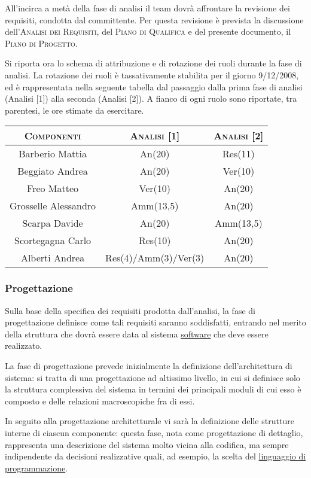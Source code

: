 \documentclass[11pt,a4paper]{article}
\begin{document}
All'incirca a metà della fase di analisi il team dovrà affrontare la revisione dei requisiti, condotta dal committente.
Per questa revisione è prevista la discussione dell'\textsc{Analisi dei Requisiti}, del \textsc{Piano di Qualifica} e del presente documento, il \textsc{Piano di Progetto}.

Si riporta ora lo schema di attribuzione e di rotazione dei ruoli durante la fase di analisi.
La rotazione dei ruoli è tassativamente stabilita per il giorno 9/12/2008, ed è rappresentata nella seguente tabella dal passaggio dalla prima fase di analisi (Analisi [1]) alla seconda (Analisi [2]).
A fianco di ogni ruolo sono riportate, tra parentesi, le ore stimate da esercitare.
\\
\begin{center}
\begin{tabular}{|c||c|c|}
\hline
\textsc{Componenti} & \textsc{Analisi [1]} & \textsc{Analisi [2]} \\ \hline \hline
Barberio Mattia & An(20) & Res(11) \\ \hline
Beggiato Andrea & An(20) & Ver(10) \\ \hline
Freo Matteo & Ver(10) & An(20) \\ \hline
Grosselle Alessandro & Amm(13,5) & An(20) \\ \hline
Scarpa Davide & An(20) & Amm(13,5) \\ \hline
Scortegagna Carlo & Res(10) & An(20) \\ \hline
Alberti Andrea & Res(4)/Amm(3)/Ver(3) & An(20) \\ \hline
\end{tabular}
\end{center}
\bigskip
\subsubsection{Progettazione}
Sulla base della specifica dei requisiti prodotta dall'analisi, la fase di progettazione definisce come tali requisiti saranno soddisfatti, entrando nel merito della struttura che dovrà essere data al sistema \underline{software} che deve essere realizzato.

La fase di progettazione prevede inizialmente la definizione dell'architettura di sistema: si tratta di una progettazione ad altissimo livello, in cui si definisce solo la struttura complessiva del sistema in termini dei principali moduli di cui esso è composto e delle relazioni macroscopiche fra di essi.

In seguito alla progettazione architetturale vi sarà la definizione delle strutture interne di ciascun componente: questa fase, nota come progettazione di dettaglio, rappresenta una descrizione del sistema molto vicina alla codifica, ma sempre indipendente da decisioni realizzative quali, ad esempio, la scelta del \underline{linguaggio di programmazione}.
\end{document}
